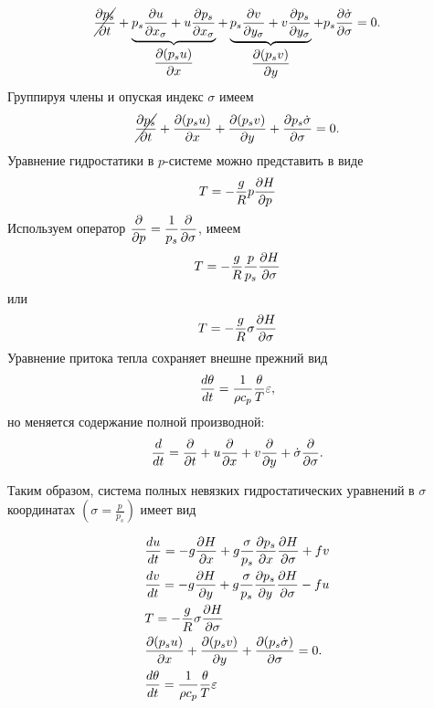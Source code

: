 \begin{equation*}
    \cancel{\displaystyle\frac{\partial p_s}{\partial t}} + 
    \underbrace{p_s\displaystyle\frac{\partial u}{\partial x_{\sigma}} + u\displaystyle\frac{\partial p_s}{\partial x_{\sigma}}}_{\displaystyle\frac{\partial (p_su)}{\partial x}} + 
    \underbrace{p_s\displaystyle\frac{\partial v}{\partial y_{\sigma}} + v\displaystyle\frac{\partial p_s}{\partial y_{\sigma}}}_{\displaystyle\frac{\partial (p_sv)}{\partial y}} + 
    p_s\displaystyle\frac{\partial \dot{\sigma}}{\partial \sigma} = 0.
\end{equation*}
Группируя члены и опуская индекс $\sigma$ имеем
\begin{equation}
    \label{eq:consm2}
    \cancel{\pd{p_s}{t}} + \pd{(p_su)}{x} + \pd{(p_sv)}{y} + \pd{p_s\dot{\sigma}}{\sigma} = 0.
\end{equation}
Уравнение гидростатики в $p$-системе можно представить в виде
\begin{equation*}
    T=-\frac{g}{R}p\displaystyle\frac{\partial H}{\partial p}
\end{equation*}
Используем оператор $\displaystyle\frac{\partial }{\partial p}=\frac{1}{p_s}\displaystyle\frac{\partial }{\partial \sigma}$, имеем
\begin{equation*}
    T=-\frac{g}{R}\frac{p}{p_s} \displaystyle\frac{\partial H}{\partial \sigma}
\end{equation*}
или 
\begin{equation}
    T=-\frac{g}{R}\sigma\displaystyle\frac{\partial H}{\partial \sigma}
\end{equation}
Уравнение притока тепла сохраняет внешне прежний вид
\begin{equation*}
    \displaystyle\frac{d \theta}{d t}=\frac{1}{\rho c_p}\frac{\theta}{T}\varepsilon,
\end{equation*}
но меняется содержание полной производной:
\begin{equation}
    \label{eq:td2sigma}
    \td{}{t}=\pd{}{t}+u\pd{}{x}+v\pd{}{y}+\dot{\sigma}\pd{}{\sigma}.
\end{equation}

Таким образом, система полных невязких гидростатических уравнений в $\sigma$ координатах $ \left( \sigma=\frac{p}{p_s} \right)$ имеет вид

\begin{align}
    \label{eq:dudt2sigma}
    &\td{u}{t} = -g\pd{H}{x}+g\frac{\sigma}{p_s}\pd{p_s}{x}\pd{H}{\sigma}+fv \\
    \label{eq:dvdt2sigma}
    &\td{v}{t} = -g\pd{H}{y}+g\frac{\sigma}{p_s}\pd{p_s}{y}\pd{H}{\sigma}-fu \\
    \label{eq:hydrostat2sigma}
    &T=-\frac{g}{R}\sigma\pd{H}{\sigma} \\
    \label{eq:consm2sigma}
    &\pd{(p_su)}{x} + \pd{(p_sv)}{y} + \pd{(p_s\dot{\sigma})}{\sigma} = 0. \\
    \label{eq:temp2sigma}
    &\td{\theta}{t}=\frac{1}{\rho c_p}\frac{\theta}{T}\varepsilon 
\end{align}

